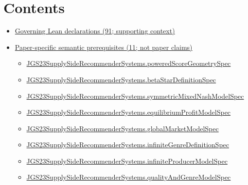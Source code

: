 \documentclass[10pt]{article}
\begin{document}
\section*{Contents}
\begin{itemize}[leftmargin=1.2em]
\item \hyperlink{governing-declaration-section-5ef5ef0364b6939c}{Governing Lean declarations (91; supporting context)}
\item \hyperlink{paper-prerequisite-section-5ef5ef0364b6939c}{Paper-specific semantic prerequisites (11; not paper claims)}
\begin{itemize}[leftmargin=1.2em]
\item \hyperlink{paper-prerequisite-98c9dadb88a2e052}{JGS23\allowbreak{}Supply\allowbreak{}Side\allowbreak{}Recommender\allowbreak{}Systems.\allowbreak{}powered\allowbreak{}Score\allowbreak{}Geometry\allowbreak{}Spec}
\item \hyperlink{paper-prerequisite-27ab0f155f5dcf24}{JGS23\allowbreak{}Supply\allowbreak{}Side\allowbreak{}Recommender\allowbreak{}Systems.\allowbreak{}beta\allowbreak{}Star\allowbreak{}Definition\allowbreak{}Spec}
\item \hyperlink{paper-prerequisite-b412efba7deb757f}{JGS23\allowbreak{}Supply\allowbreak{}Side\allowbreak{}Recommender\allowbreak{}Systems.\allowbreak{}symmetric\allowbreak{}Mixed\allowbreak{}Nash\allowbreak{}Model\allowbreak{}Spec}
\item \hyperlink{paper-prerequisite-b22f75a76a22c218}{JGS23\allowbreak{}Supply\allowbreak{}Side\allowbreak{}Recommender\allowbreak{}Systems.\allowbreak{}equilibrium\allowbreak{}Profit\allowbreak{}Model\allowbreak{}Spec}
\item \hyperlink{paper-prerequisite-1138462543e424c1}{JGS23\allowbreak{}Supply\allowbreak{}Side\allowbreak{}Recommender\allowbreak{}Systems.\allowbreak{}global\allowbreak{}Market\allowbreak{}Model\allowbreak{}Spec}
\item \hyperlink{paper-prerequisite-66c1847c0390affa}{JGS23\allowbreak{}Supply\allowbreak{}Side\allowbreak{}Recommender\allowbreak{}Systems.\allowbreak{}infinite\allowbreak{}Genre\allowbreak{}Definition\allowbreak{}Spec}
\item \hyperlink{paper-prerequisite-3cb4f88465048830}{JGS23\allowbreak{}Supply\allowbreak{}Side\allowbreak{}Recommender\allowbreak{}Systems.\allowbreak{}infinite\allowbreak{}Producer\allowbreak{}Model\allowbreak{}Spec}
\item \hyperlink{paper-prerequisite-1a7c3cb9477e5c82}{JGS23\allowbreak{}Supply\allowbreak{}Side\allowbreak{}Recommender\allowbreak{}Systems.\allowbreak{}quality\allowbreak{}And\allowbreak{}Genre\allowbreak{}Model\allowbreak{}Spec}

\end{itemize}
\end{itemize}
\end{document}
